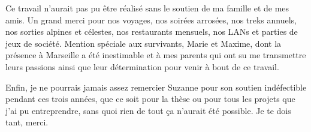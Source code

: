 \begin{acknowledgements}
Ce travail n'aurait pas pu être réalisé sans le soutien de ma famille et de mes amis. Un grand merci pour nos voyages, nos soirées arrosées, nos treks annuels, nos sorties alpines et célestes, nos restaurants mensuels, nos LANs et parties de jeux de société. Mention spéciale aux survivants, Marie et Maxime, dont la présence à Marseille a été inestimable et à mes parents qui ont su me transmettre leurs passions ainsi que leur détermination pour venir à bout de ce travail.

Enfin, je ne pourrais jamais assez remercier Suzanne pour son soutien indéfectible pendant ces trois années, que ce soit pour la thèse ou pour tous les projets que j'ai pu entreprendre, sans quoi rien de tout ça n'aurait été possible. Je te dois tant, merci.

\end{acknowledgements}
